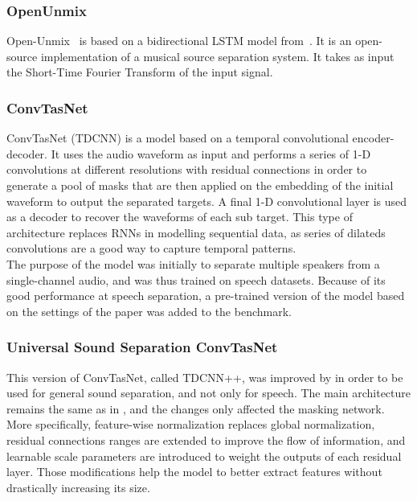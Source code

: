 \documentclass{article}
\begin{document}
			\subsubsection{OpenUnmix}
			Open-Unmix~\cite{open-unmix} is based on a bidirectional LSTM model from~\cite{Uhlich2017}. It is an open-source implementation of a musical source separation system. It takes as input the Short-Time Fourier Transform of the input signal. 
			
			\subsubsection{ConvTasNet}
			ConvTasNet \cite{tdcnn} (TDCNN) is a model based on a temporal convolutional encoder-decoder. It uses the audio waveform as input and performs a series of 1-D convolutions at different resolutions with residual connections in order to generate a pool of masks that are then applied on the embedding of the initial waveform to output the separated targets. A final 1-D convolutional layer is used as a decoder to recover the waveforms of each sub target. This type of architecture replaces RNNs in modelling sequential data, as series of dilateds convolutions are a good way to capture temporal patterns.\\
			
			The purpose of the model was initially to separate multiple speakers from a single-channel audio, and was thus trained on speech datasets. Because of its good performance at speech separation, a pre-trained version of the model based on the settings of the paper was added to the benchmark.
			
			\subsubsection{Universal Sound Separation ConvTasNet}
			This version of ConvTasNet, called TDCNN++, was improved by \cite{tdcnnpp} in order to be used for general sound separation, and not only for speech. The main architecture remains the same as in \cite{tdcnn}, and the changes only affected the masking network. More specifically, feature-wise normalization replaces global normalization, residual connections ranges are extended to improve the flow of information, and learnable scale parameters are introduced to weight the outputs of each residual layer. Those modifications help the model to better extract features without drastically increasing its size.\\
			
\end{document}
